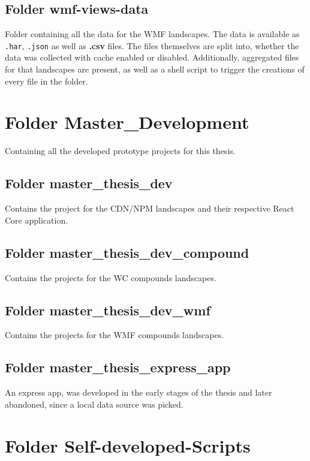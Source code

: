 \subsection{Folder wmf-views-data}

Folder containing all the data for the WMF landscapes. 
The data is available as \texttt{.har}, \texttt{.json} as well as \textbf{.csv} files. 
The files themselves are split into, whether the data was collected with cache enabled or disabled.
Additionally, aggregated files for that landscapes are present, as well as a shell script to trigger the creations of every file in the folder.

\section{Folder Master\_Development}

Containing all the developed prototype projects for this thesis. 

\subsection{Folder master\_thesis\_dev}

Contains the project for the CDN/NPM landscapes and their respective React Core application.

\subsection{Folder master\_thesis\_dev\_compound}

Contains the projects for the WC compounds landscapes.

\subsection{Folder master\_thesis\_dev\_wmf}

Contains the projects for the WMF compounds landscapes.

\subsection{Folder master\_thesis\_express\_app}

An express app, was developed in the early stages of the thesis and later abandoned, since a local data source was picked.

\section{Folder Self-developed-Scripts}

